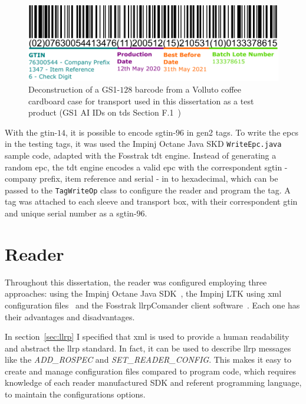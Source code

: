 \begin{figure}
    \centering
    \includegraphics[width=\textwidth]{figs/gs1-128barcode.pdf}
    \caption{Deconstruction of a GS1-$128$ barcode from a Volluto coffee cardboard case for transport used in this dissertation as a test product (GS1 AI IDs on \acs{tds} Section F.1~\cite{EPCTagData})}
    \label{fig:gs1-128barcode}
\end{figure}

With the \acs{gtin}-$14$, it is possible to encode \ac{sgtin}-$96$ in \ac{gen2} tags. To write the \acp{epc} in the testing tags, it was used the Impinj Octane Java SKD \texttt{WriteEpc.java} sample code, adapted with the Fosstrak \ac{tdt} engine. Instead of generating a random \ac{epc}, the \ac{tdt} engine encodes a valid \ac{epc} with the correspondent \ac{sgtin} - company prefix, item reference and serial - in to hexadecimal, which can be passed to the \texttt{TagWriteOp} class to configure the reader and program the tag.
A tag was attached to each sleeve and transport box, with their correspondent \ac{gtin} and unique serial number as a \ac{sgtin}-$96$.

\section{Reader} \label{sec:readerconfiguration}

Throughout this dissertation, the reader was configured employing three approaches: using the Impinj Octane Java SDK~\cite{OctaneSDK}, the Impinj LTK using \ac{xml} configuration files~\cite{LTKXMLJava} and the Fosstrak \ac{llrp}Comander client software~\cite{FosstrakLLRPCommander}.
Each one has their advantages and disadvantages.

In section~\ref{sec:llrp} I specified that \ac{xml} is used to provide a human readability and abstract the \ac{llrp} standard.
In fact, it can be used to describe \ac{llrp} messages like the \textit{ADD\_ROSPEC} and \textit{SET\_READER\_CONFIG}.
This makes it easy to create and manage configuration files compared to program code, which requires knowledge of each reader manufactured SDK and referent programming language, to maintain the configurations options.


